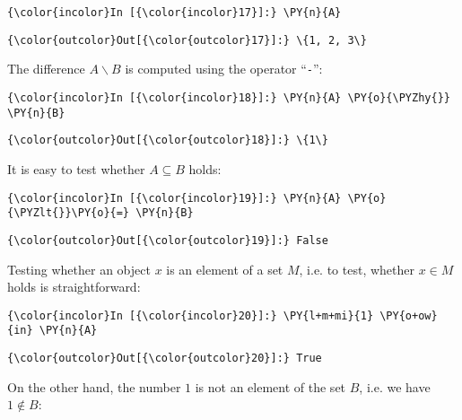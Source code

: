 \begin{Verbatim}[commandchars=\\\{\}]
{\color{incolor}In [{\color{incolor}17}]:} \PY{n}{A}
\end{Verbatim}

\begin{Verbatim}[commandchars=\\\{\}]
{\color{outcolor}Out[{\color{outcolor}17}]:} \{1, 2, 3\}
\end{Verbatim}       
The difference \(A \backslash B\) is computed using the operator ``\texttt{-}'':

\begin{Verbatim}[commandchars=\\\{\}]
{\color{incolor}In [{\color{incolor}18}]:} \PY{n}{A} \PY{o}{\PYZhy{}} \PY{n}{B}
\end{Verbatim}

\begin{Verbatim}[commandchars=\\\{\}]
{\color{outcolor}Out[{\color{outcolor}18}]:} \{1\}
\end{Verbatim}           
It is easy to test whether \(A \subseteq B\) holds:

\begin{Verbatim}[commandchars=\\\{\}]
{\color{incolor}In [{\color{incolor}19}]:} \PY{n}{A} \PY{o}{\PYZlt{}}\PY{o}{=} \PY{n}{B}
\end{Verbatim}

\begin{Verbatim}[commandchars=\\\{\}]
{\color{outcolor}Out[{\color{outcolor}19}]:} False
\end{Verbatim}           
Testing whether an object \(x\) is an element of a set \(M\), i.e. to
test, whether \(x \in M\) holds is straightforward:

\begin{Verbatim}[commandchars=\\\{\}]
{\color{incolor}In [{\color{incolor}20}]:} \PY{l+m+mi}{1} \PY{o+ow}{in} \PY{n}{A}
\end{Verbatim}

\begin{Verbatim}[commandchars=\\\{\}]
{\color{outcolor}Out[{\color{outcolor}20}]:} True
\end{Verbatim}          
On the other hand, the number \(1\) is not an element of the set \(B\),
i.e. we have \(1 \not\in B\):

